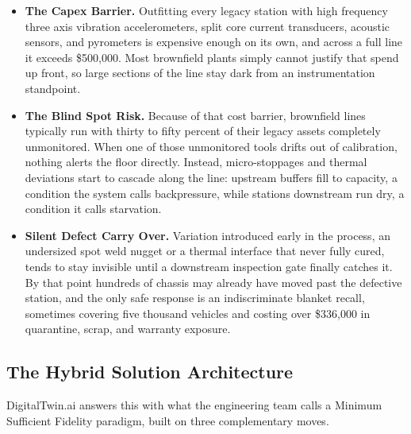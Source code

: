 \documentclass[11pt]{article}
\begin{document}
\begin{itemize}[leftmargin=1.2cm]
    \item \textbf{The Capex Barrier.} Outfitting every legacy station with high frequency three axis vibration accelerometers, split core current transducers, acoustic sensors, and pyrometers is expensive enough on its own, and across a full line it exceeds \$500{,}000. Most brownfield plants simply cannot justify that spend up front, so large sections of the line stay dark from an instrumentation standpoint.
    \item \textbf{The Blind Spot Risk.} Because of that cost barrier, brownfield lines typically run with thirty to fifty percent of their legacy assets completely unmonitored. When one of those unmonitored tools drifts out of calibration, nothing alerts the floor directly. Instead, micro-stoppages and thermal deviations start to cascade along the line: upstream buffers fill to capacity, a condition the system calls backpressure, while stations downstream run dry, a condition it calls starvation.
    \item \textbf{Silent Defect Carry Over.} Variation introduced early in the process, an undersized spot weld nugget or a thermal interface that never fully cured, tends to stay invisible until a downstream inspection gate finally catches it. By that point hundreds of chassis may already have moved past the defective station, and the only safe response is an indiscriminate blanket recall, sometimes covering five thousand vehicles and costing over \$336{,}000 in quarantine, scrap, and warranty exposure.
\end{itemize}

\subsection{The Hybrid Solution Architecture}

DigitalTwin.ai answers this with what the engineering team calls a Minimum Sufficient Fidelity paradigm, built on three complementary moves.
\end{document}
